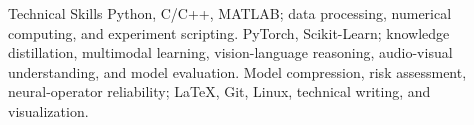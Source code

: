 
\begin{rubric}{Technical Skills}
\entry*[Coding]
  Python, C/C++, MATLAB; data processing, numerical computing, and experiment scripting.
  PyTorch, Scikit-Learn; knowledge distillation, multimodal learning, vision-language reasoning, audio-visual understanding, and model evaluation.
\entry*[Deployment]
  Model compression, risk assessment, neural-operator reliability; \LaTeX, Git, Linux, technical writing, and visualization.
\end{rubric}
